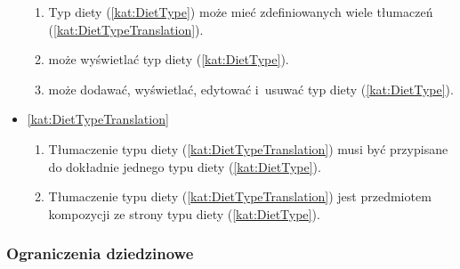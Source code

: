\begin{itemize}[label={\textbf{Reguły dla}}, wide, labelwidth=!, labelindent=0pt]
\begin{enumerate}[label={\textbf{REG/2/\protect\twodigits{\arabic{enumi}}}}, wide, labelwidth=!, align=left, leftmargin=3cm, resume]
        \item Typ diety (\ref{kat:DietType}) może mieć zdefiniowanych wiele tłumaczeń (\ref{kat:DietTypeTranslation}).
        \item {} może wyświetlać typ diety (\ref{kat:DietType}).
        \item {} może dodawać, wyświetlać, edytować i~usuwać typ diety (\ref{kat:DietType}).
    \end{enumerate}
    \item\ref{kat:DietTypeTranslation}\mynobreakpar
    \begin{enumerate}[label={\textbf{REG/2/\protect\twodigits{\arabic{enumi}}}}, wide, labelwidth=!, align=left, leftmargin=3cm, resume]
        \item Tłumaczenie typu diety (\ref{kat:DietTypeTranslation}) musi być przypisane do dokładnie jednego typu diety (\ref{kat:DietType}).
        \item Tłumaczenie typu diety (\ref{kat:DietTypeTranslation}) jest przedmiotem kompozycji ze strony typu diety (\ref{kat:DietType}).
    \end{enumerate}
\end{itemize}

\subsubsection{Ograniczenia dziedzinowe}\label{subsubsec:database:products:restrictions}

